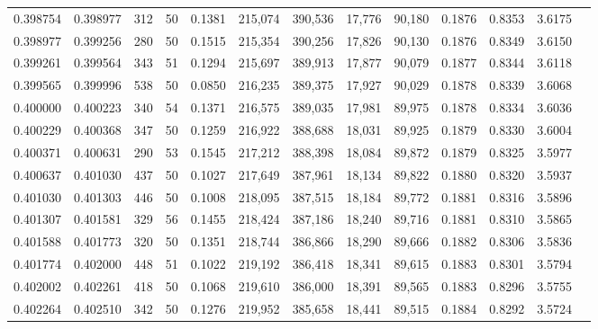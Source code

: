 \begin{tabular}{rrrrrrrrrrrrr}
0.398754 & 0.398977 &   312 &  50 &                                     0.1381 & 215,074 & 390,536 &  17,776 &  90,180 & 0.1876 & 0.8353 & 3.6175 \\
0.398977 & 0.399256 &   280 &  50 &                                     0.1515 & 215,354 & 390,256 &  17,826 &  90,130 & 0.1876 & 0.8349 & 3.6150 \\
0.399261 & 0.399564 &   343 &  51 &                                     0.1294 & 215,697 & 389,913 &  17,877 &  90,079 & 0.1877 & 0.8344 & 3.6118 \\
0.399565 & 0.399996 &   538 &  50 &                                     0.0850 & 216,235 & 389,375 &  17,927 &  90,029 & 0.1878 & 0.8339 & 3.6068 \\
0.400000 & 0.400223 &   340 &  54 &                                     0.1371 & 216,575 & 389,035 &  17,981 &  89,975 & 0.1878 & 0.8334 & 3.6036 \\
0.400229 & 0.400368 &   347 &  50 &                                     0.1259 & 216,922 & 388,688 &  18,031 &  89,925 & 0.1879 & 0.8330 & 3.6004 \\
0.400371 & 0.400631 &   290 &  53 &                                     0.1545 & 217,212 & 388,398 &  18,084 &  89,872 & 0.1879 & 0.8325 & 3.5977 \\
0.400637 & 0.401030 &   437 &  50 &                                     0.1027 & 217,649 & 387,961 &  18,134 &  89,822 & 0.1880 & 0.8320 & 3.5937 \\
0.401030 & 0.401303 &   446 &  50 &                                     0.1008 & 218,095 & 387,515 &  18,184 &  89,772 & 0.1881 & 0.8316 & 3.5896 \\
0.401307 & 0.401581 &   329 &  56 &                                     0.1455 & 218,424 & 387,186 &  18,240 &  89,716 & 0.1881 & 0.8310 & 3.5865 \\
0.401588 & 0.401773 &   320 &  50 &                                     0.1351 & 218,744 & 386,866 &  18,290 &  89,666 & 0.1882 & 0.8306 & 3.5836 \\
0.401774 & 0.402000 &   448 &  51 &                                     0.1022 & 219,192 & 386,418 &  18,341 &  89,615 & 0.1883 & 0.8301 & 3.5794 \\
0.402002 & 0.402261 &   418 &  50 &                                     0.1068 & 219,610 & 386,000 &  18,391 &  89,565 & 0.1883 & 0.8296 & 3.5755 \\
0.402264 & 0.402510 &   342 &  50 &                                     0.1276 & 219,952 & 385,658 &  18,441 &  89,515 & 0.1884 & 0.8292 & 3.5724 \\

\end{tabular}

